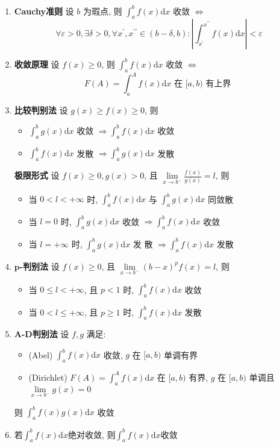 \documentclass{article}
\begin{document}
			\begin{enumerate}
				\item \textbf{Cauchy准则} 设 $b$ 为瑕点, 则 $\int_{a}^{b} f(x) \mathrm{d} x$ 收敛 $\Leftrightarrow$
				$$
				\forall \varepsilon>0, \exists \delta>0, \forall x^{\prime}, x^{\prime \prime} \in(b-\delta, b):\left|\int_{x^{\prime}}^{x^{\prime \prime}} f(x) \mathrm{d} x\right|<\varepsilon
				$$
				\item \textbf{收敛原理} 设 $f(x) \geq 0$, 则 $\int_{a}^{b} f(x) \mathrm{d} x$ 收敛 $\Leftrightarrow$
				$$
				F(A)=\int_{a}^{A} f(x) \mathrm{d} x \text { 在 }[a, b) \text { 有上界 }
				$$
				\item \textbf{比较判别法} 设 $g(x) \geq f(x) \geq 0$, 则
				\begin{itemize}
					\item $\int_{a}^{b} g(x) \mathrm{d} x$ 收敛 $\Rightarrow \int_{a}^{b} f(x) \mathrm{d} x$ 收敛
					\item $\int_{a}^{b} f(x) \mathrm{d} x$ 发散 $\Rightarrow \int_{a}^{b} g(x) \mathrm{d} x$ 发散
				\end{itemize}
				\textbf{极限形式} 设 $f(x) \geq 0, g(x)>0$, 且 $\underset{x \rightarrow b^{-}}{\lim}\frac{f(x)}{g(x)}=l$, 则
				\begin{itemize}
					\item 当 $0<l<+\infty$ 时, $\int_{a}^{b} f(x) \mathrm{d} x$ 与 $\int_{a}^{b} g(x) \mathrm{d} x$ 同敛散
					\item 当 $l=0$ 时, $\int_{a}^{b} g(x) \mathrm{d} x$ 收敛 $\Rightarrow \int_{a}^{b} f(x) \mathrm{d} x$ 收敛
					\item 当 $l=+\infty$ 时, $\int_{a}^{b} g(x) \mathrm{d} x$ 发 散 $\Rightarrow \int_{a}^{b} f(x) \mathrm{d} x$ 发散
				\end{itemize}
				\item \textbf{$\boldsymbol{p}$-判别法} 设 $f(x) \geq 0$, 且 $\underset{x \rightarrow b^{-}}{\lim}(b-x)^{p} f(x)=l$, 则
				\begin{itemize}
					\item 当 $0 \leq l<+\infty$, 且 $p<1$ 时, $\int_{a}^{b} f(x) \mathrm{d} x$ 收敛
					\item 当 $0<l \leq+\infty$, 且 $p \geq 1$ 时, $\int_{a}^{b} f(x) \mathrm{d} x$ 发散
				\end{itemize}
				\item \textbf{A-D判别法} 设 $f, g$ 满足:
				\begin{itemize}
				\item (Abel) $\int_{a}^{b} f(x) \mathrm{d} x$ 收敛, $g$ 在 $[a, b)$ 单调有界
				\item (Dirichlet) $F(A)=\int_{a}^{A} f(x) \mathrm{d} x$ 在 $[a, b)$ 有界, $g$ 在 $[a, b)$ 单调且 $\underset{x \rightarrow b^{-}}{\lim} g(x)=0$
				\end{itemize}
				则 $\int_{a}^{b} f(x) g(x) \mathrm{d} x$ 收敛
				\item 若$\int_{a}^{b} f(x) \mathrm{d} x$绝对收敛, 则$\int_{a}^{b} f(x) \mathrm{d} x$收敛
				\end{enumerate}
\end{document}

